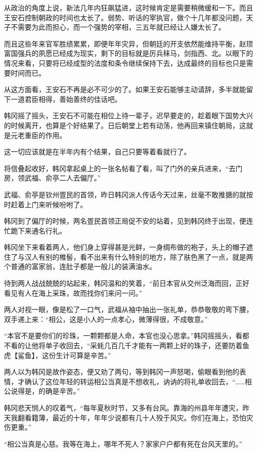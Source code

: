 从政治的角度上说，新法几年内狂飙猛进，这时候肯定是需要稍微缓和一下。而且王安石控制朝政的时间也太长了。弱势、听话的宰执官，做个十几年都没问题，天子不需要为此而担心，而一个强势的宰相，三五年就已经让人嫌太长了。

而且这些年来官军胜绩累累，即便年年灾异，但朝廷的开支依然能维持平衡，赵顼富国强兵的夙愿已经成为现实，剩下的目标就是厉兵秣马，剑指西、北。以眼下的情况来看，只要将已经成型的法度和条令继续保持下去，达成最终的目标也只是需要时间而已。

从这方面看，王安石不再是必不可少的了。如果王安石能够主动请辞，多半就能留下一道君臣相得，善始善终的佳话吧。

韩冈摇了摇头，王安石不可能在相位上待一辈子，迟早要走的，趁着眼下国势大兴的时候离开，也算是个好结果了。日后朝堂上若有动荡，他再回来镇住朝局，这就是元老重臣的作用。

这一切应该就是在半年内有个结果，自己只要等着看就行了。

将信叠起收好，韩冈拿起桌上的一张名帖看了看，叫了门外的亲兵进来，“去门房，领武福、俞亭二人去偏厅。”

武福、俞亭是钦州疍民的首领，昨日韩冈派人传话今天过来，丝毫不敢推搪的就按时赶着上门来听候吩咐了。

韩冈到了偏厅的时候，两名疍民首领正局促不安的站着，见到韩冈终于出现，便连忙跪下来通名行礼。

韩冈坐下来看着两人，他们身上穿得甚是光鲜，一身绸布做的袍子，头上的帽子遮住了与汉人有别的椎髻，看不出来有什么特别的地方，除了肤色黑了一点，就是两个普通的富家翁，连肚子都是一般儿的装满油水。

待到两人战战兢兢的站起来，韩冈温和的笑着，“前日本官从交州泛海而回，正好看见有人在海上采珠，故而找你们来问一问。”

两人对视一眼，像是松了一口气，武福从袖中抽出一张礼单，恭恭敬敬的弯下腰，双手递上来：“相公，这是小人的一点孝心，微薄得很，不成敬意。”

“本官不是要你们的珍珠，一颗颗都是人命，本官也没心思拿。”韩冈摇摇头，看都不看的让他将单子收回去，“采蚝几百几千才能有一两颗上好的珠子，还要防着鱼虎【鲨鱼】，这份生计可算是辛苦。”

两人以为韩冈是故作姿态，便又劝了两句，等到韩冈一声怒喝，偷眼看到他的表情，才确认了这位年轻的转运相公当真是不想收礼，讷讷的将礼单收回去，“……相公说得是，的确是辛苦。”

韩冈悲天悯人的叹着气，“每年夏秋时节，又多有台风。靠海的州县年年遭灾，昨天我翻看籍簿，最近的十年，年年少说都有几十人殁于风灾。你们在海上，恐怕灾伤更重。”

“相公当真是心慈。我等在海上，哪年不死人？家家户户都有死在台风天里的。”

